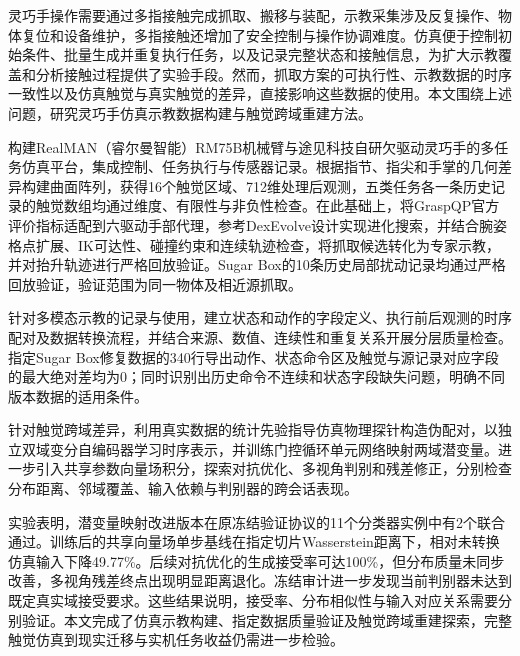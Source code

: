 \begin{cabstract}
灵巧手操作需要通过多指接触完成抓取、搬移与装配，示教采集涉及反复操作、物体复位和设备维护，多指接触还增加了安全控制与操作协调难度。仿真便于控制初始条件、批量生成并重复执行任务，以及记录完整状态和接触信息，为扩大示教覆盖和分析接触过程提供了实验手段。然而，抓取方案的可执行性、示教数据的时序一致性以及仿真触觉与真实触觉的差异，直接影响这些数据的使用。本文围绕上述问题，研究灵巧手仿真示教数据构建与触觉跨域重建方法。

构建RealMAN（睿尔曼智能）RM75B机械臂与途见科技自研欠驱动灵巧手的多任务仿真平台，集成控制、任务执行与传感器记录。根据指节、指尖和手掌的几何差异构建曲面阵列，获得16个触觉区域、712维处理后观测，五类任务各一条历史记录的触觉数组均通过维度、有限性与非负性检查。在此基础上，将GraspQP官方评价指标适配到六驱动手部代理，参考DexEvolve设计实现进化搜索，并结合腕姿格点扩展、IK可达性、碰撞约束和连续轨迹检查，将抓取候选转化为专家示教，并对抬升轨迹进行严格回放验证。Sugar Box的10条历史局部扰动记录均通过严格回放验证，验证范围为同一物体及相近源抓取。

针对多模态示教的记录与使用，建立状态和动作的字段定义、执行前后观测的时序配对及数据转换流程，并结合来源、数值、连续性和重复关系开展分层质量检查。指定Sugar Box修复数据的340行导出动作、状态命令区及触觉与源记录对应字段的最大绝对差均为0；同时识别出历史命令不连续和状态字段缺失问题，明确不同版本数据的适用条件。

针对触觉跨域差异，利用真实数据的统计先验指导仿真物理探针构造伪配对，以独立双域变分自编码器学习时序表示，并训练门控循环单元网络映射两域潜变量。进一步引入共享参数向量场积分，探索对抗优化、多视角判别和残差修正，分别检查分布距离、邻域覆盖、输入依赖与判别器的跨会话表现。

实验表明，潜变量映射改进版本在原冻结验证协议的11个分类器实例中有2个联合通过。训练后的共享向量场单步基线在指定切片Wasserstein距离下，相对未转换仿真输入下降49.77\%。后续对抗优化的生成接受率可达100\%，但分布质量未同步改善，多视角残差终点出现明显距离退化。冻结审计进一步发现当前判别器未达到既定真实域接受要求。这些结果说明，接受率、分布相似性与输入对应关系需要分别验证。本文完成了仿真示教构建、指定数据质量验证及触觉跨域重建探索，完整触觉仿真到现实迁移与实机任务收益仍需进一步检验。
\end{cabstract}

